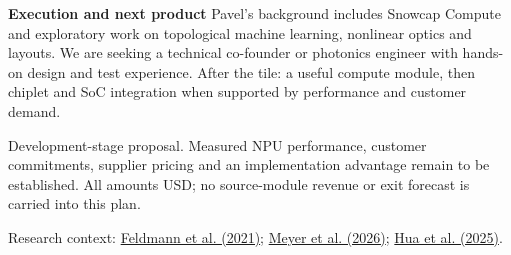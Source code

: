 \documentclass[10pt]{article}
\newcommand{\labelled}[1]{\textbf{\color{accent}#1}\quad}
\begin{document}
\labelled{Execution and next product}
Pavel's background includes Snowcap Compute and exploratory work on topological machine learning, nonlinear optics and layouts. We are seeking a technical co-founder or photonics engineer with hands-on design and test experience. After the tile: a useful compute module, then chiplet and SoC integration when supported by performance and customer demand.

{\footnotesize\color{accent} Development-stage proposal. Measured NPU performance, customer commitments, supplier pricing and an implementation advantage remain to be established. All amounts USD; no source-module revenue or exit forecast is carried into this plan.}

{\scriptsize Research context: \href{https://www.nature.com/articles/s41586-020-03070-1}{Feldmann et al. (2021)}; \href{https://www.nature.com/articles/s41467-026-71599-2}{Meyer et al. (2026)}; \href{https://www.nature.com/articles/s41586-025-08786-6}{Hua et al. (2025)}.}
\end{document}
